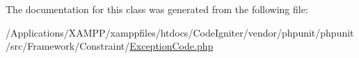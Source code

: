 The documentation for this class was generated from the following file\+:\begin{DoxyCompactItemize}
\item 
/\+Applications/\+X\+A\+M\+P\+P/xamppfiles/htdocs/\+Code\+Igniter/vendor/phpunit/phpunit/src/\+Framework/\+Constraint/\mbox{\hyperlink{_exception_code_8php}{Exception\+Code.\+php}}\end{DoxyCompactItemize}
